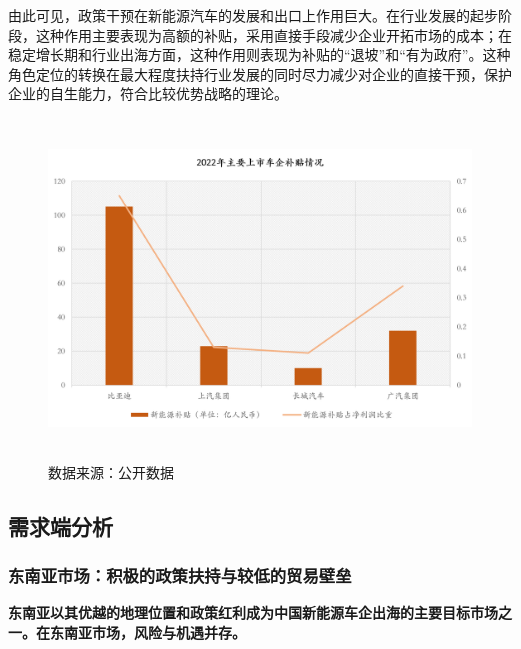 \documentclass[a4paper, 10pt]{article}
\begin{document}
    由此可见，政策干预在新能源汽车的发展和出口上作用巨大。在行业发展的起步阶段，这种作用主要表现为高额的补贴，采用直接手段减少企业开拓市场的成本；在稳定增长期和行业出海方面，这种作用则表现为补贴的“退坡”和“有为政府”。这种角色定位的转换在最大程度扶持行业发展的同时尽力减少对企业的直接干预，保护企业的自生能力，符合比较优势战略的理论。
    \begin{figure}[ht]
      \centering 
      \includegraphics[height=9cm,width=13.5cm]{fg5.png}
      
      \caption{数据来源：公开数据}
      \label{5}
      
      \end{figure}
    \subsection{需求端分析}
    \subsubsection{东南亚市场：积极的政策扶持与较低的贸易壁垒}
\textbf{东南亚以其优越的地理位置和政策红利成为中国新能源车企出海的主要目标市场之一。在东南亚市场，风险与机遇并存。}
\end{document}
